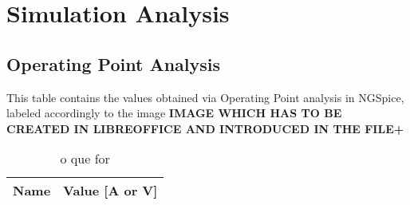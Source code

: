 \section{Simulation Analysis}
\label{sec:simulation}

\subsection{Operating Point Analysis}

This table contains the values obtained via Operating Point analysis in NGSpice, labeled accordingly to the image \textbf{IMAGE WHICH HAS TO BE CREATED IN LIBREOFFICE AND INTRODUCED IN THE FILE+}

\begin{table}[h]
  \centering
  \begin{tabular}{|l|r|}
    \hline    
    {\bf Name} & {\bf Value [A or V]} \\ \hline
    
  \end{tabular}
  \caption{o que for}
  \label{tab:op}
\end{table}



%

%
